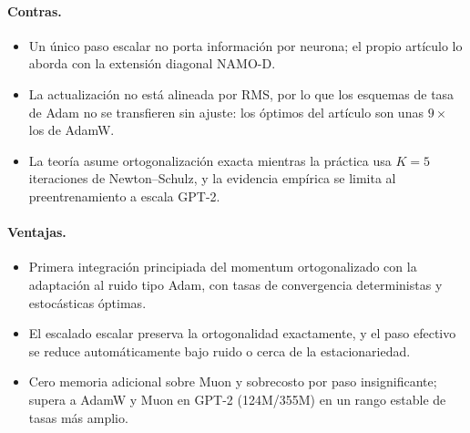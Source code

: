 \paragraph{Contras.}
\begin{itemize}[leftmargin=*]
\item Un único paso escalar no porta información por neurona; el propio artículo lo
  aborda con la extensión diagonal NAMO-D.
\item La actualización no está alineada por RMS, por lo que los esquemas de tasa de
  Adam no se transfieren sin ajuste: los óptimos del artículo son unas $9\times$ los de
  AdamW.
\item La teoría asume ortogonalización exacta mientras la práctica usa $K{=}5$
  iteraciones de Newton--Schulz, y la evidencia empírica se limita al preentrenamiento
  a escala GPT-2.
\end{itemize}

\paragraph{Ventajas.}
\begin{itemize}[leftmargin=*]
\item Primera integración principiada del momentum ortogonalizado con la adaptación al
  ruido tipo Adam, con tasas de convergencia deterministas y estocásticas óptimas.
\item El escalado escalar preserva la ortogonalidad exactamente, y el paso efectivo se
  reduce automáticamente bajo ruido o cerca de la estacionariedad.
\item Cero memoria adicional sobre Muon y sobrecosto por paso insignificante; supera a
  AdamW y Muon en GPT-2 (124M/355M) en un rango estable de tasas más amplio.
\end{itemize}

